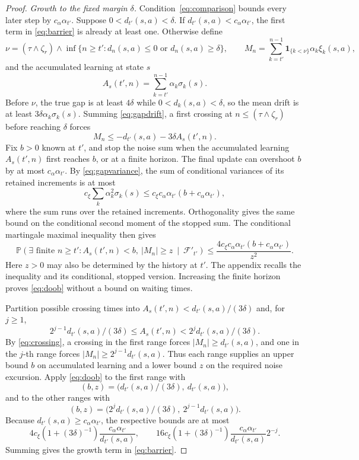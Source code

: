 \begin{proof}
\emph{Growth to the fixed margin $\delta$.} Condition~\eqref{eq:comparison} bounds every later step by $c_\alpha\alpha_{t'}$. Suppose $0<d_{t'}(s,a)<\delta$. If $d_{t'}(s,a)<c_\alpha\alpha_{t'}$, the first term in \eqref{eq:barrier} is already
at least one. Otherwise define
\[
\nu=(\tau\wedge\zeta_r)\wedge\inf\{n\ge t':d_n(s,a)\le0\text{ or }d_n(s,a)\ge\delta\},\qquad
M_n=\sum_{k=t'}^{n-1}\mathbf1_{\{k<\nu\}}\alpha_k\xi_k(s,a),
\]
and the accumulated learning at state $s$
\begin{equation}\label{eq:clock}
A_s(t',n)=\sum_{k=t'}^{n-1}\alpha_k\sigma_k(s).
\end{equation}
Before $\nu$, the true gap is at least $4\delta$ while $0<d_k(s,a)<\delta$, so the mean drift is at least $3\delta\alpha_k\sigma_k(s)$. Summing \eqref{eq:gapdrift}, a first crossing at $n\le(\tau\wedge\zeta_r)$ before reaching $\delta$ forces
\begin{equation}\label{eq:crossing}
M_n\le-d_{t'}(s,a)-3\delta A_s(t',n).
\end{equation}
Fix $b>0$ known at $t'$, and stop the noise sum when the accumulated learning $A_s(t',n)$ first reaches $b$, or at a finite horizon. The final update can overshoot $b$ by at most $c_\alpha\alpha_{t'}$. By \eqref{eq:gapvariance}, the sum of conditional variances of its retained increments is at most
\[
c_\xi\sum_k\alpha_k^2\sigma_k(s)
\le c_\xi c_\alpha\alpha_{t'}(b+c_\alpha\alpha_{t'}),
\]
where the sum runs over the retained increments. Orthogonality gives the same bound on the conditional second moment of the stopped sum. The conditional martingale maximal inequality then gives
\begin{equation}\label{eq:doob}
\mathbb P\!\left(\exists\text{ finite }n\ge t':
A_s(t',n)<b,\ |M_n|\ge z\ \middle|\ \mathcal F'_{t'}\right)
\le\frac{4c_\xi c_\alpha\alpha_{t'}(b+c_\alpha\alpha_{t'})}{z^2}.
\end{equation}
Here $z>0$ may also be determined by the history at $t'$. The appendix recalls the inequality and its conditional, stopped version. Increasing the finite horizon proves \eqref{eq:doob} without a bound on waiting times.

Partition possible crossing times into $A_s(t',n)<d_{t'}(s,a)/(3\delta)$ and, for $j\ge1$,
\[
2^{j-1}d_{t'}(s,a)/(3\delta)\le A_s(t',n)<2^jd_{t'}(s,a)/(3\delta).
\]
By \eqref{eq:crossing}, a crossing in the first range forces $|M_n|\ge d_{t'}(s,a)$, and one in the $j$-th range forces $|M_n|\ge2^{j-1}d_{t'}(s,a)$. Thus each range supplies an upper bound $b$ on accumulated learning and a lower bound $z$ on the required noise excursion. Apply \eqref{eq:doob} to the first range with
\[
(b,z)=\big(d_{t'}(s,a)/(3\delta),\ d_{t'}(s,a)\big),
\]
and to the other ranges with
\[
(b,z)=\big(2^jd_{t'}(s,a)/(3\delta),\ 2^{j-1}d_{t'}(s,a)\big).
\]
Because $d_{t'}(s,a)\ge c_\alpha\alpha_{t'}$, the respective bounds are at most
\[
4c_\xi(1+(3\delta)^{-1})\frac{c_\alpha\alpha_{t'}}{d_{t'}(s,a)},\qquad
16c_\xi(1+(3\delta)^{-1})\frac{c_\alpha\alpha_{t'}}{d_{t'}(s,a)}2^{-j}.
\]
Summing gives the growth term in \eqref{eq:barrier}.


\end{proof}
